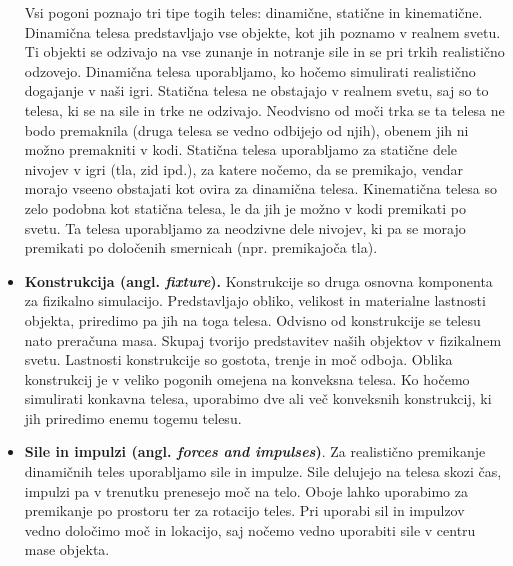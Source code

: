 \documentclass[12pt,a4paper,twoside]{book}
\begin{document}
\begin{itemize}
	Vsi pogoni poznajo tri tipe togih teles: dinamične, statične in kinematične. Dinamična telesa predstavljajo vse objekte, kot jih poznamo v realnem svetu. Ti objekti se odzivajo na vse zunanje in notranje sile in se pri trkih realistično odzovejo. Dinamična telesa uporabljamo, ko hočemo simulirati realistično dogajanje v naši igri. Statična telesa ne obstajajo v realnem svetu, saj so to telesa, ki se na sile in trke ne odzivajo. Neodvisno od moči trka se ta telesa ne bodo premaknila (druga telesa se vedno odbijejo od njih), obenem jih ni možno premakniti v kodi. Statična telesa uporabljamo za statične dele nivojev v igri (tla, zid ipd.), za katere nočemo, da se premikajo, vendar morajo vseeno obstajati kot ovira za dinamična telesa. Kinematična telesa so zelo podobna kot statična telesa, le da jih je možno v kodi premikati po svetu. Ta telesa uporabljamo za neodzivne dele nivojev, ki pa se morajo premikati po določenih smernicah (npr. premikajoča tla).
	\item \textbf{Konstrukcija (angl. \textit{fixture}).} Konstrukcije so druga osnovna komponenta za fizikalno simulacijo. Predstavljajo obliko, velikost in materialne lastnosti objekta, priredimo pa jih na toga telesa. Odvisno od konstrukcije se telesu nato preračuna masa. Skupaj tvorijo predstavitev naših objektov v fizikalnem svetu. Lastnosti konstrukcije so gostota, trenje in moč odboja. Oblika konstrukcij je v veliko pogonih omejena na konveksna telesa. Ko hočemo simulirati konkavna telesa, uporabimo dve ali več konveksnih konstrukcij, ki jih priredimo enemu togemu telesu.
	\item \textbf{Sile in impulzi (angl. \textit{forces and impulses})}. Za realistično premikanje dinamičnih teles uporabljamo sile in impulze. Sile delujejo na telesa skozi čas, impulzi pa v trenutku prenesejo moč na telo. Oboje lahko uporabimo za premikanje po prostoru ter za rotacijo teles. Pri uporabi sil in impulzov vedno določimo moč in lokacijo, saj nočemo vedno uporabiti sile v centru mase objekta.
	

\end{itemize}
\end{document}
